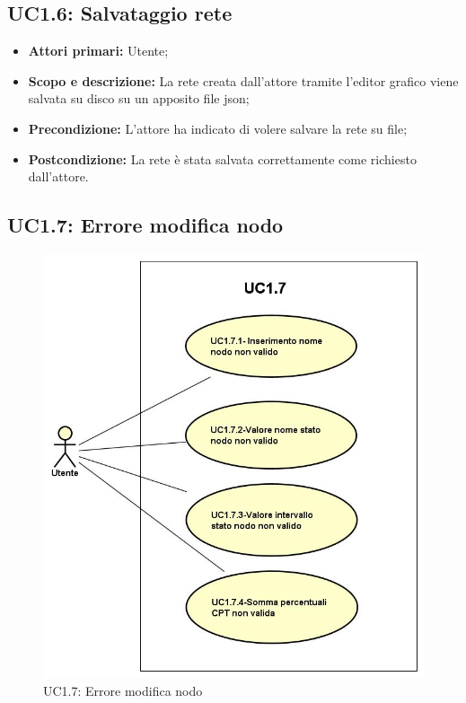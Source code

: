 \subsection{UC1.6: Salvataggio rete} 
\begin{itemize} 
	\item{\textbf{Attori primari:} Utente;} 
	\item{\textbf{Scopo e descrizione:} La rete creata dall'attore tramite l'editor grafico viene salvata su disco su un apposito file json;} 
	\item{\textbf{Precondizione:} L'attore ha indicato di volere salvare la rete su file;} 
	\item{\textbf{Postcondizione:} La rete è stata salvata correttamente come richiesto dall'attore.} 
\end{itemize} 
\subsection{UC1.7: Errore modifica nodo}
\begin{figure} [H]
	\centering
	\includegraphics[scale=0.45]{Img/UC1-7} 
	\caption{UC1.7: Errore modifica nodo} \label{} 
\end{figure}
